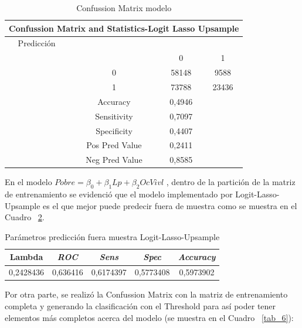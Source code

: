 \documentclass[conference, 10pt]{IEEEtran}
\begin{document}
\begin{table}[htbp]
\caption{Confussion Matrix modelo }
\begin{center}
\begin{tabular}{|c c c c|}
\hline
\multicolumn{4}{|c|}{\textbf{Confussion Matrix and Statistics-Logit Lasso Upsample}} \\
\cline{1-4} 
\hline
 Predicción&& &\\
 & &0&1\\
 &0&58148&9588\\
  &1&73788&23436\\
	\hline
&{Accuracy}&0,4946& \\
	&{Sensitivity} &0,7097& \\
&{Specificity} &0,4407& \\
&{Pos Pred Value}&0,2411& \\
& {Neg Pred Value} &0,8585& \\
\hline
\end{tabular}
\label{tab_4}
\end{center}
\end{table}

En el modelo $Pobre = \beta_0+\beta_{1}Lp +\beta_{2}OcVivl$ , dentro de la partición de la matriz de entrenamiento se evidenció que el modelo implementado por Logit-Lasso-Upsample es el que mejor puede predecir fuera de muestra como se muestra en el Cuadro ~\ref{tab_5}.

\begin{table}[htbp]
\caption{Parámetros predicción fuera muestra Logit-Lasso-Upsample}
\begin{center}
\begin{tabular}{|c|c|c|c|c|}
\hline
\textbf{Lambda} & \textbf{\textit{ROC}}& \textbf{\textit{Sens}} & \textbf{\textit{Spec}}& \textbf{\textit{Accuracy}}\\
\hline
0,2428436 & 0,636416  &0,6174397  &0,5773408  &0,5973902  \\
\hline
\end{tabular}
\label{tab_5}
\end{center}
\end{table}

Por otra parte, se realizó la Confussion Matrix con la matriz de entrenamiento completa y generando la clasificación con el Threshold para así poder tener elementos más completos acerca del modelo (se muestra en el Cuadro ~\ref{tab_6}):
\end{document}
